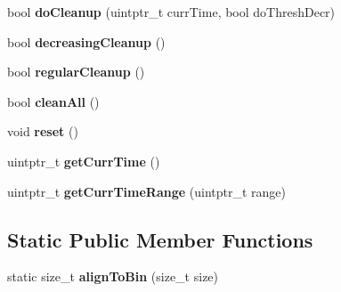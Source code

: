 \begin{DoxyCompactItemize}
\item 
\hypertarget{classrml_1_1internal_1_1LargeObjectCache_a70e5c9048a33a823e2c501034a7741d9}{}bool {\bfseries do\+Cleanup} (uintptr\+\_\+t curr\+Time, bool do\+Thresh\+Decr)\label{classrml_1_1internal_1_1LargeObjectCache_a70e5c9048a33a823e2c501034a7741d9}

\item 
\hypertarget{classrml_1_1internal_1_1LargeObjectCache_a1b4817b5a9b34747c9fe3a87846f07c9}{}bool {\bfseries decreasing\+Cleanup} ()\label{classrml_1_1internal_1_1LargeObjectCache_a1b4817b5a9b34747c9fe3a87846f07c9}

\item 
\hypertarget{classrml_1_1internal_1_1LargeObjectCache_ac95d34c2b0a798c5b3a1f7e74b4d11af}{}bool {\bfseries regular\+Cleanup} ()\label{classrml_1_1internal_1_1LargeObjectCache_ac95d34c2b0a798c5b3a1f7e74b4d11af}

\item 
\hypertarget{classrml_1_1internal_1_1LargeObjectCache_a0001d250a61fc1d4145e5276ae4c6d2d}{}bool {\bfseries clean\+All} ()\label{classrml_1_1internal_1_1LargeObjectCache_a0001d250a61fc1d4145e5276ae4c6d2d}

\item 
\hypertarget{classrml_1_1internal_1_1LargeObjectCache_a138bad6355dd068d0e27f883f55285d6}{}void {\bfseries reset} ()\label{classrml_1_1internal_1_1LargeObjectCache_a138bad6355dd068d0e27f883f55285d6}

\item 
\hypertarget{classrml_1_1internal_1_1LargeObjectCache_a548a39b62fd83695e31576b0c8a08a27}{}uintptr\+\_\+t {\bfseries get\+Curr\+Time} ()\label{classrml_1_1internal_1_1LargeObjectCache_a548a39b62fd83695e31576b0c8a08a27}

\item 
\hypertarget{classrml_1_1internal_1_1LargeObjectCache_a0a2f9dcfc03683e8113124767a13b4b5}{}uintptr\+\_\+t {\bfseries get\+Curr\+Time\+Range} (uintptr\+\_\+t range)\label{classrml_1_1internal_1_1LargeObjectCache_a0a2f9dcfc03683e8113124767a13b4b5}

\end{DoxyCompactItemize}
\subsection*{Static Public Member Functions}
\begin{DoxyCompactItemize}
\item 
\hypertarget{classrml_1_1internal_1_1LargeObjectCache_a86d3acb6b112cca993efe0d43cb3b645}{}static size\+\_\+t {\bfseries align\+To\+Bin} (size\+\_\+t size)\label{classrml_1_1internal_1_1LargeObjectCache_a86d3acb6b112cca993efe0d43cb3b645}

\end{DoxyCompactItemize}

